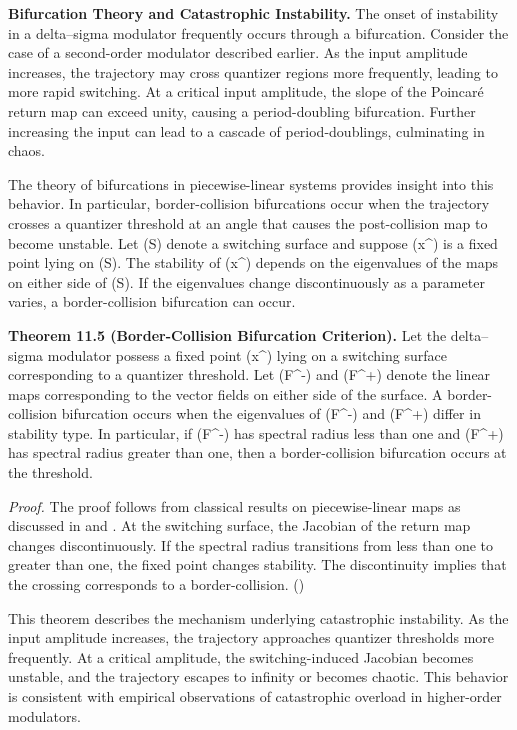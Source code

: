 \medskip

\textbf{Bifurcation Theory and Catastrophic Instability.}
The onset of instability in a delta–sigma modulator frequently occurs through a bifurcation. Consider the case of a second-order modulator described earlier. As the input amplitude increases, the trajectory may cross quantizer regions more frequently, leading to more rapid switching. At a critical input amplitude, the slope of the Poincaré return map can exceed unity, causing a period-doubling bifurcation. Further increasing the input can lead to a cascade of period-doublings, culminating in chaos.

The theory of bifurcations in piecewise-linear systems provides insight into this behavior. In particular, border-collision bifurcations occur when the trajectory crosses a quantizer threshold at an angle that causes the post-collision map to become unstable. Let (S) denote a switching surface and suppose (x^{\ast}) is a fixed point lying on (S). The stability of (x^{\ast}) depends on the eigenvalues of the maps on either side of (S). If the eigenvalues change discontinuously as a parameter varies, a border-collision bifurcation can occur.

\medskip

\textbf{Theorem 11.5 (Border-Collision Bifurcation Criterion).}
Let the delta–sigma modulator possess a fixed point (x^{\ast}) lying on a switching surface corresponding to a quantizer threshold. Let (F^{-}) and (F^{+}) denote the linear maps corresponding to the vector fields on either side of the surface. A border-collision bifurcation occurs when the eigenvalues of (F^{-}) and (F^{+}) differ in stability type. In particular, if (F^{-}) has spectral radius less than one and (F^{+}) has spectral radius greater than one, then a border-collision bifurcation occurs at the threshold.

\textit{Proof.}
The proof follows from classical results on piecewise-linear maps as discussed in \cite{guckenheimerholmes1983nonlineardynamics} and \cite{strogatz1994nonlineardynamics}. At the switching surface, the Jacobian of the return map changes discontinuously. If the spectral radius transitions from less than one to greater than one, the fixed point changes stability. The discontinuity implies that the crossing corresponds to a border-collision. \hfill(\square)

\medskip

This theorem describes the mechanism underlying catastrophic instability. As the input amplitude increases, the trajectory approaches quantizer thresholds more frequently. At a critical amplitude, the switching-induced Jacobian becomes unstable, and the trajectory escapes to infinity or becomes chaotic. This behavior is consistent with empirical observations of catastrophic overload in higher-order modulators.

